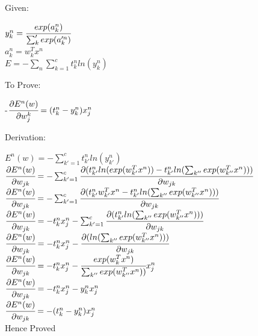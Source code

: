 \documentclass{article} %
\begin{document}
Given:
\begin{center}
	$y_k^n = \cfrac{exp(a_{k}^n)}{\sum_k' exp(a_k'^n)}$\\
    \hfill\break
$a_{k}^n = w_k^T x^n$\\
\hfill\break
$E = −\sum_n \sum_{k=1}^{c} t^n_k ln(y_k^n)$
\end{center}
To Prove:
\begin{center}
    -$\cfrac{\partial E^n(w)}{\partial w_j^k} = (t^n_k-y^n_k)x^n_j $\\
    \hfill\break
\end{center}
Derivation:
\begin{center}
$E^n(w) = -\sum_{k'=1}^{c} t^n_{k'} ln(y_{k'}^n)$\\
\hfill\break
\hfill\break
$\cfrac{\partial E^n(w)}{\partial w_{jk}} = -\sum_{k'=1}^{c}\cfrac{\partial(t^n_{k'}ln(exp(w_{k'}^Tx^n))-t^n_{k'}ln(\sum_{k''}exp(w_{k''}^Tx^n)))}{\partial w_{jk}}$\\
	\hfill\break
    \hfill\break
$\cfrac{\partial E^n(w)}{\partial w_{jk}} = -\sum_{k'=1}^{c}\cfrac{\partial(t^n_{k'}w_{k'}^Tx^n-t^n_{k'}ln(\sum_{k''}exp(w_{k''}^Tx^n)))}{\partial w_{jk}}$\\
    \hfill\break
    \hfill\break
$\cfrac{\partial E^n(w)}{\partial w_{jk}} = -t^n_kx^n_j-\sum_{k'=1}^{c}\cfrac{\partial (t^n_{k'}ln(\sum_{k''}exp(w_{k''}^Tx^n)))}{\partial w_{jk}}$\\
    \hfill\break
    \hfill\break
$\cfrac{\partial E^n(w)}{\partial w_{jk}} = -t^n_kx^n_j-\cfrac{\partial (ln(\sum_{k''}exp(w_{k''}^Tx^n)))}{\partial w_{jk}}$\\
    \hfill\break
    \hfill\break
$\cfrac{\partial E^n(w)}{\partial w_{jk}} = -t^n_kx^n_j-\cfrac{exp(w_k^Tx^n)}{\sum_{k''}exp(w_{k''}^Tx^n))}x^n_j$\\
    \hfill\break
    \hfill\break
$\cfrac{\partial E^n(w)}{\partial w_{jk}} = -t^n_kx^n_j-y_k^nx^n_j$\\
    \hfill\break
    \hfill\break
$\cfrac{\partial E^n(w)}{\partial w_{jk}} = -(t^n_k-y_k^n)x^n_j$\\
    \hfill\break
    Hence Proved 

\end{center}
\end{document}
